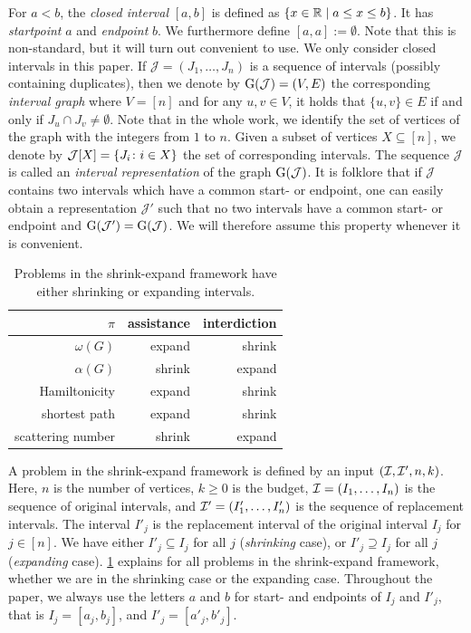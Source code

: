 For $a < b$, the \emph{closed interval} $[a, b]$ is defined as $\{ x \in \mathbb{R} \mid a \leq x \leq b \}$. It has \emph{startpoint} $a$ and \emph{endpoint} $b$. We furthermore define $[a, a] := \emptyset$. Note that this is non-standard, but it will turn out convenient to use. We only consider closed intervals in this paper. If $\mathcal{J} =  (J_1, \dots, J_n)$ is a sequence of intervals (possibly containing duplicates), then we denote by $\operatorname{G}(\mathcal{J}) = (V,E)$ the corresponding \emph{interval graph}
where $V = [n]$ and for any $u,v \in V$, it holds that $\{u,v\} \in E$ if and only if 
$J_u \cap J_v \neq \emptyset$. Note that in the whole work, we identify the set of 
vertices of the graph with the integers from $1$ to $n$. Given a subset of vertices $X \subseteq [n]$, we denote by 
$\mathcal{J}[X] = \{ J_i \colon i \in X \}$ the set of corresponding intervals.
The sequence $\mathcal{J}$ is called an \emph{interval representation} of the graph $\operatorname{G}(\mathcal{J})$. It is folklore that if $\mathcal{J}$ contains two intervals which have a common start- or endpoint, one can easily obtain a representation $\mathcal{J}'$ such that no two intervals have a common start- or endpoint and $\operatorname{G}(\mathcal{J}') = \operatorname{G}(\mathcal{J})$. We will therefore assume this property whenever it is convenient.



\begin{table}
\centering
\begin{tabular}{r|rr}
$\pi$ & assistance & interdiction\\
\hline
$\omega(G)$ & expand & shrink\\
$\alpha(G)$ & shrink & expand \\
Hamiltonicity & expand & shrink \\
shortest path & expand & shrink \\
scattering number & shrink & expand
\end{tabular}
\caption{Problems in the shrink-expand framework have either shrinking or expanding intervals.}
\label{tab:shrink-expand-overview}
\end{table}
A problem in the shrink-expand framework is defined by an input $(\mathcal{I}, \mathcal{I}', n, k)$. Here, $n$ is the number of vertices, $k \geq 0$ is the budget, $\mathcal{I} = (I_1, \dots, I_n)$ is the sequence of original intervals, and $\mathcal{I}' = (I'_1, \dots, I'_n)$ is the sequence of replacement intervals. The interval $I'_j$ is the replacement interval of the original interval $I_j$ for $j \in [n]$.  We have either $I'_j \subseteq I_j$ for all $j$ (\emph{shrinking} case), or $I'_j \supseteq I_j$ for all $j$ (\emph{expanding} case). \cref{tab:shrink-expand-overview} explains for all problems in the shrink-expand framework, whether we are in the shrinking case or the expanding case. Throughout the paper, we always use the letters $a$ and $b$ for start- and endpoints of $I_j$ and $I'_j$, that is $I_j = [a_j, b_j]$, and $I'_j = [a'_j, b'_j]$.

